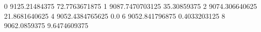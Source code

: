 0 9125.21484375 72.7763671875
1 9087.7470703125 35.30859375
2 9074.306640625 21.8681640625
4 9052.4384765625 0.0
6 9052.841796875 0.4033203125
8 9062.0859375 9.6474609375
